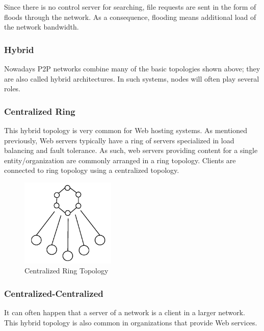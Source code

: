 Since there is no control server for searching, file requests are sent in the
form of floods through the network. As a consequence, flooding means additional
load of the network bandwidth.

\subsubsection{Hybrid}

Nowadays P2P networks combine many of the basic topologies shown above; they
are also called hybrid architectures. In such systems, nodes will often play
several roles.

\subsubsection{Centralized Ring}

This hybrid topology is very common for Web hosting systems. As mentioned
previously, Web servers typically have a ring of servers specialized in load
balancing and fault tolerance. As such, web servers providing content for a
single entity/organization are commonly arranged in a ring topology.  Clients
are connected to ring topology using a centralized topology.

\begin{figure}
  \centering
  \includegraphics[width=0.4\textwidth]{src/img/p2p-systems/centralized-ring}
  \caption{Centralized Ring Topology}
  \label{fig:p2p-systems:centralized-ring}
\end{figure}

\subsubsection{Centralized-Centralized}

It can often happen that a server of a network is a client in a larger
network. This hybrid topology is also common in organizations that provide
Web services.

